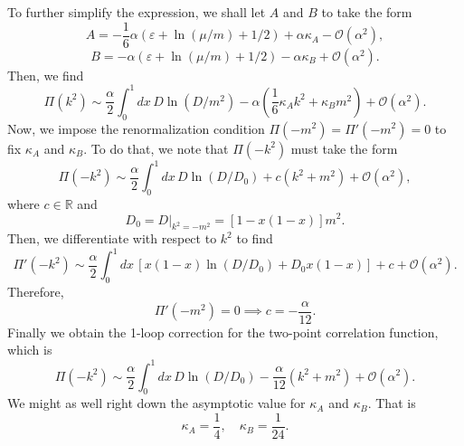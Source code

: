 To further simplify the expression, we shall let $A$ and $B$ to take the form 
\begin{equation}
    A = -\frac{1}{6}\alpha(\varepsilon+\ln(\mu/m)+1/2) +\alpha \kappa_A - \mathcal{O}(\alpha^2),
\end{equation}
\begin{equation}
    B = -\alpha(\varepsilon+\ln(\mu/m)+1/2) - \alpha\kappa_B + \mathcal{O}(\alpha^2).
\end{equation}
Then, we find
\begin{equation}
    \Pi(k^2) \sim \frac{\alpha}{2}\int^1_0 dx \,D\ln(D/m^2) - \alpha\left(\frac{1}{6}\kappa_A k^2 + \kappa_B m^2\right) + \mathcal{O}(\alpha^2).
\end{equation}
Now, we impose the renormalization condition $\Pi(-m^2) = \Pi'(-m^2) = 0$ to fix $\kappa_A$ and $\kappa_B$. To do that, we note that $\Pi(-k^2)$ must take the form
\begin{equation}
    \Pi(-k^2) \sim \frac{\alpha}{2}\int^1_0dx\, D\ln(D/D_0) + c(k^2+m^2) + \mathcal{O}(\alpha^2),
\end{equation}
where $c\in \mathbb{R}$ and
\begin{equation}
    D_0 = D\big|_{k^2=-m^2} = [1-x(1-x)]m^2.
\end{equation}
Then, we differentiate with respect to $k^2$ to find
\begin{equation}
    \Pi'(-k^2) \sim \frac{\alpha}{2}\int^1_0dx\,\left[x(1-x)\ln(D/D_0) + D_0x(1-x)\right] +c +\mathcal{O}(\alpha^2).
\end{equation}
Therefore,
\begin{equation}
    \Pi'(-m^2) = 0\implies c = -\frac{\alpha}{12}.
\end{equation}
Finally we obtain the 1-loop correction for the two-point correlation function, which is
\begin{equation}
    \Pi(-k^2) \sim \frac{\alpha}{2}\int^1_0dx\, D\ln(D/D_0) -\frac{\alpha}{12}(k^2+m^2) + \mathcal{O}(\alpha^2).
\end{equation}
We might as well right down the asymptotic value for $\kappa_A$ and $\kappa_B$. That is
\begin{equation}
    \kappa_A = \frac{1}{4},\quad \kappa_B = \frac{1}{24}.
\end{equation}

